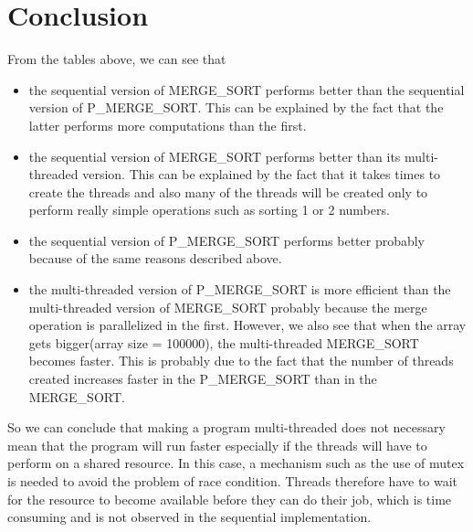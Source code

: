 \documentclass[12pt]{article}
\begin{document}
	\section{Conclusion}
		From the tables above, we can see that
		\begin{itemize}
			\item the sequential version of MERGE\_SORT performs better than the sequential version of P\_MERGE\_SORT. This can be explained by the fact that the latter performs more computations than the first.
			\item the sequential version of MERGE\_SORT performs better than its multi-threaded version. This can be explained by the fact that it takes times to create the threads and also many of the threads will be created only to perform really simple operations such as sorting 1 or 2 numbers.
			\item the sequential version of P\_MERGE\_SORT performs better probably because of the same reasons described above.
			\item the multi-threaded version of P\_MERGE\_SORT is more efficient than the multi-threaded version of MERGE\_SORT probably because the merge operation is parallelized in the first. However, we also see that when the array gets bigger(array size = 100000), the multi-threaded MERGE\_SORT becomes faster. This is probably due to the fact that the number of threads created increases faster in the P\_MERGE\_SORT than in the MERGE\_SORT.
		\end{itemize}
			So  we can conclude that making a program multi-threaded does not necessary mean that the program will run faster especially if the threads will have to perform on a shared resource. In this case, a mechanism such as the use of mutex is needed to avoid the problem of race condition. Threads therefore have to wait for the resource to become available before they can do their job, which is time consuming and is not observed in the sequential implementation. 
	
\end{document}
